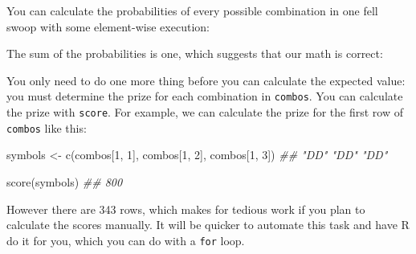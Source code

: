 \documentclass[
  letterpaper,
  DIV=11,
  numbers=noendperiod]{scrbook}
\newenvironment{Shaded}{\begin{snugshade}}{\end{snugshade}}
\newcommand{\DecValTok}[1]{\textcolor[rgb]{0.68,0.00,0.00}{#1}}
\newcommand{\DocumentationTok}[1]{\textcolor[rgb]{0.37,0.37,0.37}{\textit{#1}}}
\newcommand{\FunctionTok}[1]{\textcolor[rgb]{0.28,0.35,0.67}{#1}}
\newcommand{\NormalTok}[1]{\textcolor[rgb]{0.00,0.23,0.31}{#1}}
\newcommand{\OtherTok}[1]{\textcolor[rgb]{0.00,0.23,0.31}{#1}}
\newcommand{\SpecialCharTok}[1]{\textcolor[rgb]{0.37,0.37,0.37}{#1}}
\begin{document}
You can calculate the probabilities of every possible combination in one
fell swoop with some element-wise execution:

\begin{Shaded}
\end{Shaded}

The sum of the probabilities is one, which suggests that our math is
correct:

\begin{Shaded}
\end{Shaded}

You only need to do one more thing before you can calculate the expected
value: you must determine the prize for each combination in
\texttt{combos}. You can calculate the prize with \texttt{score}. For
example, we can calculate the prize for the first row of \texttt{combos}
like this:

\begin{Shaded}
\begin{Highlighting}[]
\NormalTok{symbols }\OtherTok{\textless{}{-}} \FunctionTok{c}\NormalTok{(combos[}\DecValTok{1}\NormalTok{, }\DecValTok{1}\NormalTok{], combos[}\DecValTok{1}\NormalTok{, }\DecValTok{2}\NormalTok{], combos[}\DecValTok{1}\NormalTok{, }\DecValTok{3}\NormalTok{])}
\DocumentationTok{\#\# "DD" "DD" "DD"}

\FunctionTok{score}\NormalTok{(symbols)}
\DocumentationTok{\#\# 800}
\end{Highlighting}
\end{Shaded}

However there are 343 rows, which makes for tedious work if you plan to
calculate the scores manually. It will be quicker to automate this task
and have R do it for you, which you can do with a \texttt{for} loop.
\end{document}

